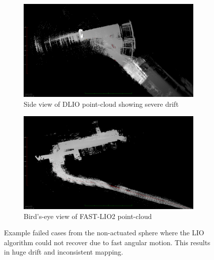 \documentclass[english, bachelor, utf8]{base/thesis_telematics}
\begin{document}
\begin{figure}[h]
\centering
\begin{subfigure}{0.49\columnwidth}
    \centering
    \includegraphics[width=\textwidth]{pics/drifts_bending/dlio_drift.png}
    \caption{Side view of DLIO point-cloud showing severe drift}\label{fig:dlio_drift}
\end{subfigure}
\begin{subfigure}{0.49\columnwidth}
    \centering
    \includegraphics[width=\textwidth]{pics/drifts_bending/lio_drifts.png}
    \caption{Bird's-eye view of FAST-LIO2 point-cloud}\label{fig:lio_drift}
\end{subfigure}
\caption{Example failed cases from the non-actuated sphere where the LIO algorithm could not recover due to fast angular motion.
This results in huge drift and inconsistent mapping.}\vspace{-3mm}
\label{fig:drift}
\end{figure}
\end{document}
